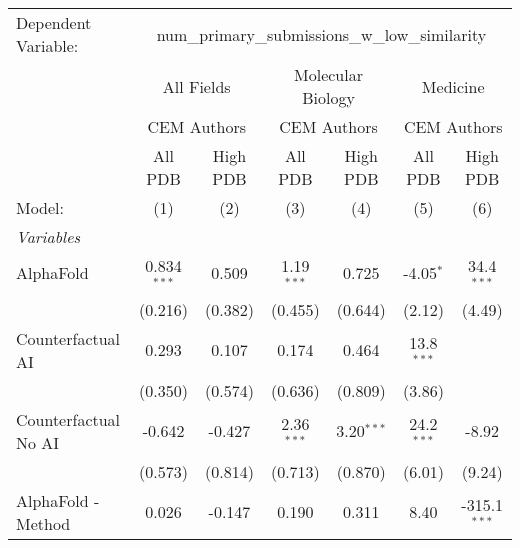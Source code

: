 \begingroup
\centering
\begin{tabular}{lcccccc}
   \tabularnewline \midrule \midrule
   Dependent Variable: & \multicolumn{6}{c}{num\_primary\_submissions\_w\_low\_similarity}\\
 & \multicolumn{2}{c}{All Fields} & \multicolumn{2}{c}{Molecular Biology} & \multicolumn{2}{c}{Medicine} \\
\cmidrule(lr){2-3} \cmidrule(lr){4-5} \cmidrule(lr){6-7}
 & \multicolumn{2}{c}{CEM Authors} & \multicolumn{2}{c}{CEM Authors} & \multicolumn{2}{c}{CEM Authors} \\
\cmidrule(lr){2-3} \cmidrule(lr){4-5} \cmidrule(lr){6-7}
 & \multicolumn{1}{c}{All PDB} & \multicolumn{1}{c}{High PDB} & \multicolumn{1}{c}{All PDB} & \multicolumn{1}{c}{High PDB} & \multicolumn{1}{c}{All PDB} & \multicolumn{1}{c}{High PDB} \\
\cmidrule(lr){2-2} \cmidrule(lr){3-3} \cmidrule(lr){4-4} \cmidrule(lr){5-5} \cmidrule(lr){6-6} \cmidrule(lr){7-7}
   Model:                                                     & (1)           & (2)     & (3)           & (4)           & (5)             & (6)\\  
   \midrule
   \emph{Variables}\\
   AlphaFold                                                  & 0.834$^{***}$ & 0.509   & 1.19$^{***}$  & 0.725         & -4.05$^{*}$     & 34.4$^{***}$\\   
                                                              & (0.216)       & (0.382) & (0.455)       & (0.644)       & (2.12)          & (4.49)\\   
   Counterfactual AI                                          & 0.293         & 0.107   & 0.174         & 0.464         & 13.8$^{***}$    &   \\   
                                                              & (0.350)       & (0.574) & (0.636)       & (0.809)       & (3.86)          &   \\   
   Counterfactual No AI                                       & -0.642        & -0.427  & 2.36$^{***}$  & 3.20$^{***}$  & 24.2$^{***}$    & -8.92\\   
                                                              & (0.573)       & (0.814) & (0.713)       & (0.870)       & (6.01)          & (9.24)\\   
   AlphaFold - Method                                         & 0.026         & -0.147  & 0.190         & 0.311         & 8.40            & -315.1$^{***}$\\   

\end{tabular}
